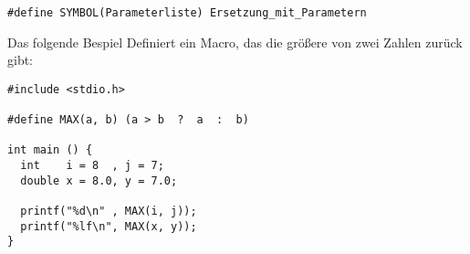 \begin{codebox}
\begin{verbatim}
#define SYMBOL(Parameterliste) Ersetzung_mit_Parametern
\end{verbatim}
\end{codebox}

Das folgende Bespiel Definiert ein Macro, das die größere von zwei Zahlen zurück gibt:
\begin{codebox}
\begin{verbatim}
#include <stdio.h>

#define MAX(a, b) (a > b  ?  a  :  b)

int main () {
  int    i = 8  , j = 7;
  double x = 8.0, y = 7.0;  

  printf("%d\n" , MAX(i, j));
  printf("%lf\n", MAX(x, y));
}
\end{verbatim}
\end{codebox}

